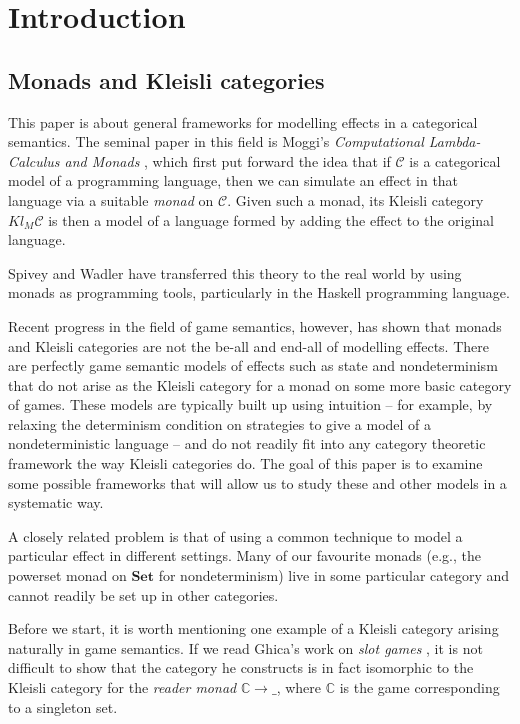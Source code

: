 \documentclass{svproc}
\newcommand\C{\mathcal{C}}
\newcommand{\catname}[1]{\mathbf{#1}}
\newcommand{\Set}{\catname{Set}}
\begin{document}
\section{Introduction}

\subsection{Monads and Kleisli categories}

This paper is about general frameworks for modelling effects in a categorical semantics.  
The seminal paper in this field is Moggi's \emph{Computational Lambda-Calculus and Monads} \cite{Moggi}, which first put forward the idea that if $\C$ is a categorical model of a programming language, then we can simulate an effect in that language via a suitable \emph{monad} on $\C$.  
Given such a monad, its Kleisli category $Kl_M\C$ is then a model of a language formed by adding the effect to the original language.  

Spivey \cite{Spivey} and Wadler \cite{Wadler1,Wadler2} have transferred this theory to the real world by using monads as programming tools, particularly in the Haskell programming language.  

Recent progress in the field of game semantics, however, has shown that monads and Kleisli categories are not the be-all and end-all of modelling effects.  
There are perfectly game semantic models of effects such as state and nondeterminism that do not arise as the Kleisli category for a monad on some more basic category of games.  
These models are typically built up using intuition -- for example, by relaxing the determinism condition on strategies to give a model of a nondeterministic language -- and do not readily fit into any category theoretic framework the way Kleisli categories do.  
The goal of this paper is to examine some possible frameworks that will allow us to study these and other models in a systematic way.  

A closely related problem is that of using a common technique to model a particular effect in different settings.  
Many of our favourite monads (e.g., the powerset monad on $\Set$ for nondeterminism) live in some particular category and cannot readily be set up in other categories. 

Before we start, it is worth mentioning one example of a Kleisli category arising naturally in game semantics.  
If we read Ghica's work on \emph{slot games} \cite{SlotGames}, it is not difficult to show that the category he constructs is in fact isomorphic to the Kleisli category for the \emph{reader monad} $\mathbb{C}\to \_$, where $\mathbb{C}$ is the game corresponding to a singleton set.  
\end{document}
